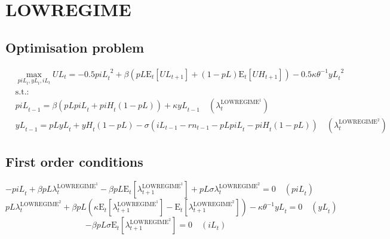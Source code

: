 \section{LOWREGIME}

\subsection{Optimisation problem}

\begin{align}
&\max_{{p\!i\!L}_{t}, {y\!L}_{t}, {i\!L}_{t}
} {U\!L}_{t} = -0.5{{p\!i\!L}_{t}}^{2} + {\beta} \left({{p\!L}} {\mathrm{E}_{t}\left[{U\!L}_{t+1}\right]} + \left(1 - {p\!L}\right) {\mathrm{E}_{t}\left[{U\!H}_{t+1}\right]}\right) - 0.5{\kappa} {\theta}^{-1} {{y\!L}_{t}}^{2}\\
&\mathrm{s.t.:}\nonumber\\
& {p\!i\!L}_{t-1} = {\beta} \left({{p\!L}} {{p\!i\!L}_{t}} + {{p\!i\!H}_{t}} \left(1 - {p\!L}\right)\right) + {\kappa} {{y\!L}_{t-1}} \quad \left(\lambda^{\mathrm{LOWREGIME}^{\mathrm{1}}}_{t}\right)\\
& {y\!L}_{t-1} = {{p\!L}} {{y\!L}_{t}} + {{y\!H}_{t}} \left(1 - {p\!L}\right) - {\sigma} \left({i\!L}_{t-1} - {r\!n}_{t-1} - {{p\!L}} {{p\!i\!L}_{t}} - {{p\!i\!H}_{t}} \left(1 - {p\!L}\right)\right) \quad \left(\lambda^{\mathrm{LOWREGIME}^{\mathrm{2}}}_{t}\right)
\end{align}


\subsection{First order conditions}

\begin{equation}
-{p\!i\!L}_{t} + {\beta} {{p\!L}} {\lambda^{\mathrm{LOWREGIME}^{\mathrm{1}}}_{t}} - {\beta} {{p\!L}} {\mathrm{E}_{t}\left[\lambda^{\mathrm{LOWREGIME}^{\mathrm{1}}}_{t+1}\right]} + {{p\!L}} {\sigma} {\lambda^{\mathrm{LOWREGIME}^{\mathrm{2}}}_{t}} = 0
 \quad \left({p\!i\!L}_{t}\right)
\end{equation}
\begin{equation}
{{p\!L}} {\lambda^{\mathrm{LOWREGIME}^{\mathrm{2}}}_{t}} + {\beta} {{p\!L}} \left({\kappa} {\mathrm{E}_{t}\left[\lambda^{\mathrm{LOWREGIME}^{\mathrm{1}}}_{t+1}\right]} - \mathrm{E}_{t}\left[\lambda^{\mathrm{LOWREGIME}^{\mathrm{2}}}_{t+1}\right]\right) - {\kappa} {\theta}^{-1} {{y\!L}_{t}} = 0
 \quad \left({y\!L}_{t}\right)
\end{equation}
\begin{equation}
-{\beta} {{p\!L}} {\sigma} {\mathrm{E}_{t}\left[\lambda^{\mathrm{LOWREGIME}^{\mathrm{2}}}_{t+1}\right]} = 0
 \quad \left({i\!L}_{t}\right)
\end{equation}




